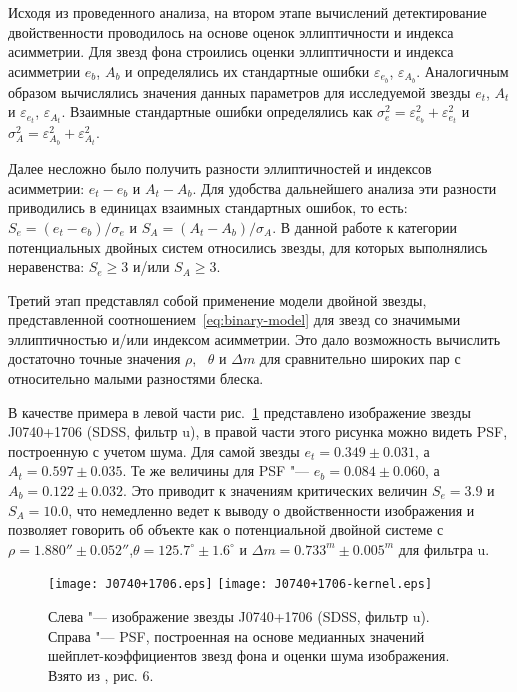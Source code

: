 Исходя из проведенного анализа, на втором этапе вычислений детектирование двойственности проводилось на основе оценок эллиптичности и индекса асимметрии. Для звезд фона строились оценки эллиптичности и индекса асимметрии $e_{b}$, $A_{b}$ и определялись их стандартные ошибки $\varepsilon_{e_{b}}$, $\varepsilon_{A_{b}}$. Аналогичным образом вычислялись значения данных параметров для исследуемой звезды $e_{t}$, $A_{t}$ и $\varepsilon_{e_{t}}$, $\varepsilon_{A_{t}}$. Взаимные стандартные ошибки определялись как $\sigma_e^2 = \varepsilon_{e_{b}}^2+\varepsilon_{e_{t}}^2$ и $\sigma_A^2 = \varepsilon_{A_{b}}^2+\varepsilon_{A_{t}}^2$.

Далее несложно было получить разности эллиптичностей и индексов асимметрии: $e_{t} - e_{b}$ и $A_{t} - A_{b}$. Для удобства дальнейшего анализа эти разности приводились в единицах взаимных стандартных ошибок, то есть:  $S_e = (e_{t} - e_{b})/\sigma_e$ и $S_A =(A_{t} - A_{b})/\sigma_A$. В данной работе к категории потенциальных двойных систем относились звезды, для которых выполнялись неравенства: $S_e\geq3$ и/или $S_A\geq3$.

Третий этап представлял собой применение модели двойной звезды, представленной соотношением~\ref{eq:binary-model} для звезд со значимыми эллиптичностью и/или индексом асимметрии. Это дало возможность вычислить достаточно точные значения $\rho$,  ~$\theta$ и $\Delta m$ для сравнительно широких пар с относительно малыми разностями блеска.

В качестве примера в левой части рис.~\ref{fig:J0740+1706} представлено изображение звезды J0740+1706  (SDSS, фильтр u), в правой части этого рисунка можно видеть PSF, построенную с учетом шума. Для самой звезды $e_{t} =0.349\pm0.031$, а   $A_{t} = 0.597\pm0.035$. Те же величины для PSF "--- $e_{b} =0.084\pm0.060$, а $A_{b} =0.122\pm0.032$. Это приводит к значениям критических величин $S_e = 3.9$ и $S_A = 10.0$, что немедленно ведет к выводу о двойственности изображения и позволяет говорить об объекте как о потенциальной двойной системе с $\rho = 1.880''\pm0.052''$,$\theta=125.7^\circ\pm1.6^\circ$ и $\Delta m= 0.733^m\pm0.005^m$ для фильтра u.

\begin{figure}[h]
\centering
\texttt{[image: J0740+1706.eps]}
\texttt{[image: J0740+1706-kernel.eps]}
\caption{Слева "--- изображение звезды J0740+1706  (SDSS, фильтр u). Справа "--- PSF, построенная на основе медианных значений шейплет-коэффициентов звезд фона и оценки шума изображения. Взято из \cite{2018AstL...44..103K}, рис. 6.}
\label{fig:J0740+1706}
\end{figure}

